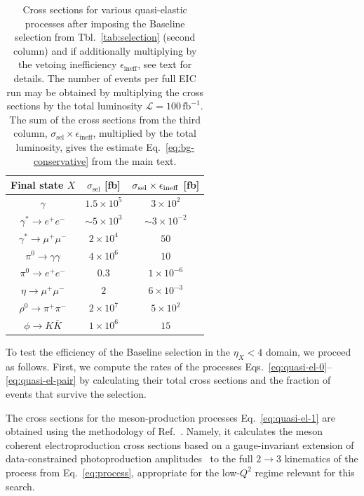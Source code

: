 \documentclass[aps,prd,preprintnumbers,superscriptaddress,nofootinbib,floatfix,twocolumn,notitlepage,reprint]{revtex4-2}
\newcommand{\cL}{\mathcal{L}}
\newcommand{\fb}{\mathrm{fb}}
\begin{document}
\begin{table}[t!]
    \centering
    \begin{tabular}{|c|c|c|}
     \hline Final state $X$  & $\sigma_{\text{sel}}$ [fb] &$\sigma_{\rm sel}\times \epsilon_{\rm ineff}$ [fb]  \\ \hline
    $\gamma$  & $1.5\times 10^{5}$ & $3\times 10^{2}$ \\ \hline
    $\gamma^{*}\to e^{+}e^{-}$  & $\sim 5\times 10^{3}$ & $\sim 3\times 10^{-2}$ \\ \hline
    $\gamma^{*}\to\mu^{+}\mu^{-}$ & $2\times 10^{4}$ & $50$ \\ \hline
    $\pi^{0}\to \gamma\gamma$  & $4\times 10^{6}$ & $10$ \\ \hline
   $\pi^{0}\to e^{+}e^{-}$  & $0.3$ & $1 \times 10^{-6}$ \\ \hline
    $\eta\to \mu^{+}\mu^{-}$  & $2$ & $6\times 10^{-3}$ \\ \hline
    $\rho^{0}\to \pi^{+}\pi^{-}$  & $2\times 10^{7}$ & $5\times 10^{2}$ \\ \hline
    $\phi \to K\bar{K}$  & $1\times 10^{6}$ & $15$ \\ \hline
    \end{tabular}
    \caption{Cross sections for various quasi-elastic processes after imposing the Baseline selection from Tbl.~\ref{tab:selection} (second column) and if additionally multiplying by the vetoing inefficiency $\epsilon_{\text{ineff}}$, see text for details. The number of events per full EIC run may be obtained by multiplying the cross sections by the total luminosity $\cL=100\,\fb^{-1}$. The sum of the cross sections from the third column, $\sigma_{\text{sel}}\times\epsilon_{\text{ineff}}$, multiplied by the total luminosity, gives the estimate Eq.~\eqref{eq:bg-conservative} from the main text.}
    \label{tab:quasi-elastic-bg}
\end{table}

To test the efficiency of the Baseline selection in the $\eta_{X}<4$ domain, we proceed as follows. 
First, we compute the rates of the processes Eqs.~\eqref{eq:quasi-el-0}--\eqref{eq:quasi-el-pair} by calculating their total cross sections and the fraction of events that survive the selection.

The cross sections for the meson-production processes Eq.~\eqref{eq:quasi-el-1} are obtained using the methodology of Ref.~\cite{Balkin:2026whv}. Namely, it calculates the meson coherent electroproduction cross sections based on a gauge-invariant extension of data-constrained photoproduction amplitudes~\cite{Yu:2016zut,Yu:2017vvp,Kashevarov:2017vyl,Wang:2025rvr} to the full $2\to3$ kinematics of the process from Eq.~\eqref{eq:process}, appropriate for the low-$Q^2$ regime relevant for this search.
\end{document}
